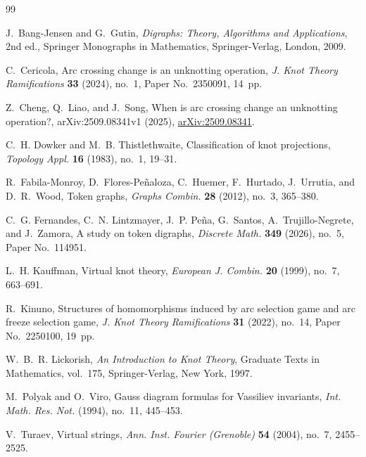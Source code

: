 \documentclass[11pt]{amsart}
\theoremstyle{definition}
\theoremstyle{remark}
\begin{document}
\begin{thebibliography}{99}

J.~Bang-Jensen and G.~Gutin,
\newblock \emph{Digraphs: Theory, Algorithms and Applications}, 2nd ed.,
\newblock Springer Monographs in Mathematics, Springer-Verlag, London, 2009.

C.~Cericola,
\newblock Arc crossing change is an unknotting operation,
\newblock \emph{J. Knot Theory Ramifications} \textbf{33} (2024), no.~1,
Paper No.~2350091, 14~pp.

Z.~Cheng, Q.~Liao, and J.~Song,
\newblock When is arc crossing change an unknotting operation?,
\newblock arXiv:2509.08341v1 (2025),
\newblock \href{https://arxiv.org/abs/2509.08341}{arXiv:2509.08341}.

C.~H. Dowker and M.~B. Thistlethwaite,
\newblock Classification of knot projections,
\newblock \emph{Topology Appl.} \textbf{16} (1983), no.~1, 19--31.


R.~Fabila-Monroy, D.~Flores-Pe\~naloza, C.~Huemer, F.~Hurtado, J.~Urrutia,
and D.~R.~Wood,
\newblock Token graphs,
\newblock \emph{Graphs Combin.} \textbf{28} (2012), no.~3, 365--380.


C.~G. Fernandes, C.~N. Lintzmayer, J.~P. Pe\~na, G.~Santos,
A.~Trujillo-Negrete, and J.~Zamora,
\newblock A study on token digraphs,
\newblock \emph{Discrete Math.} \textbf{349} (2026), no.~5,
Paper No.~114951.

L.~H. Kauffman,
\newblock Virtual knot theory,
\newblock \emph{European J. Combin.} \textbf{20} (1999), no.~7, 663--691.

R.~Kinuno,
\newblock Structures of homomorphisms induced by arc selection game and arc
freeze selection game,
\newblock \emph{J. Knot Theory Ramifications} \textbf{31} (2022), no.~14,
Paper No.~2250100, 19~pp.

W.~B.~R. Lickorish,
\newblock \emph{An Introduction to Knot Theory},
\newblock Graduate Texts in Mathematics, vol.~175, Springer-Verlag, New York,
1997.

M.~Polyak and O.~Viro,
\newblock Gauss diagram formulas for Vassiliev invariants,
\newblock \emph{Int. Math. Res. Not.} (1994), no.~11, 445--453.

V.~Turaev,
\newblock Virtual strings,
\newblock \emph{Ann. Inst. Fourier (Grenoble)} \textbf{54} (2004), no.~7,
2455--2525.

\end{thebibliography}
\end{document}
